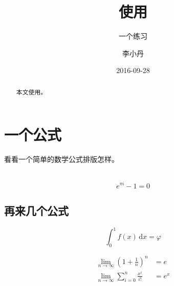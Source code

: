 \documentclass{scrartcl}
\begin{document}
\begin{CJK}{UTF8}{gbsn}

\chead{\headmark}
\cfoot[]{}

\title{使用}
\subtitle{一个练习}
\author{李小丹}
\date{2016-09-28}

\begin{titlepage}

\begin{spacing}{1}
\maketitle

\begin{abstract}
	本文使用。
\end{abstract}

\vspace{1cm}

{\small{\tableofcontents}}

\end{spacing}
\end{titlepage}

\section{一个公式}
看看一个简单的数学公式排版怎样。\\

~\\

\begin{equation}
	e^{\pi i} - 1 = 0
\end{equation}

\subsection{再来几个公式}
\begin{equation}
	\int_0^1 f(x)\,\mathrm{d}x = \varphi
\end{equation}

\begin{align}
	\lim_{n \to \infty} \left(1 + \frac{1}{n} \right) ^ n & = e\\
	\lim_{n \to \infty} \sum_{i=0}^{n} \frac{x^i}{i!} & = e^x
\end{align}

~\\


\end{CJK}
\end{document}
